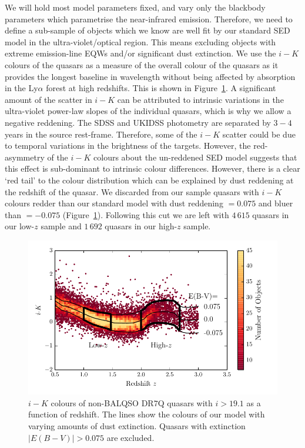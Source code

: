 We will hold most model parameters fixed, and vary only the blackbody parameters which parametrise the near-infrared emission. 
Therefore, we need to define a sub-sample of objects which we know are well fit by our standard SED model in the ultra-violet/optical region. 
This means excluding objects with extreme emission-line EQWs and/or significant dust extinction.
We use the $i-K$ colours of the quasars as a measure of the overall colour of the quasars as it provides the longest baseline in wavelength without being affected by absorption in the Ly$\alpha$ forest at high redshifts. 
This is shown in Figure~\ref{fig:ikzplot}.
A significant amount of the scatter in $i-K$ can be attributed to intrinsic variations in the ultra-violet power-law slopes of the individual quasars, which is why we allow a negative reddening. 
The SDSS and UKIDSS photometry are separated by $3-4$ years in the source rest-frame. 
Therefore, some of the $i-K$ scatter could be due to temporal variations in the brightness of the targets. 
However, the red-asymmetry of the $i-K$ colours about the un-reddened SED model suggests that this effect is sub-dominant to intrinsic colour differences. 
However, there is a clear `red tail' to the colour distribution which can be explained by dust reddening at the redshift of the quasar.
We discarded from our sample quasars with $i - K$ colours redder than our standard model with dust reddening \ebv $= 0.075$ and bluer than \ebv $=-0.075$ (Figure~\ref{fig:ikzplot}). 
Following this cut we are left with $4\,615$ quasars in our low-$z$ sample and $1\,692$ quasars in our high-$z$ sample. 

\begin{figure}
  \centering
  \includegraphics[width=\columnwidth]{figures/chapter05/ik_versus_z_low_ext.pdf}
  \caption[{$i-K$ colours of non-BALQSO DR7Q quasars with $i>19.1$ as a function of redshift.}]{$i-K$ colours of non-BALQSO DR$7$Q quasars with $i>19.1$ as a function of redshift. The lines show the colours of our model with varying amounts of dust extinction. Quasars with extinction $|E(B-V)|>0.075$ are excluded.}
  \label{fig:ikzplot}
\end{figure}

